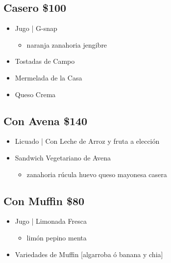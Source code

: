 \subsection{Casero \textbar{} \$100}\label{casero-100}
\begin{itemize} \tightlist
\item   Jugo | G-snap 
  \begin{itemize}
   \item naranja zanahoria jengibre
  \end{itemize}

\item   Tostadas de Campo
\item   Mermelada de la Casa
\item   Queso Crema
\end{itemize}

\bigskip

\subsection{Con Avena \textbar{} \$140}\label{con-avena-140}
\begin{itemize} \tightlist
\item  Licuado | Con Leche de Arroz y fruta a elección %
\item  Sandwich Vegetariano de Avena 
  \begin{itemize}
   \item zanahoria rúcula huevo queso mayonesa casera
  \end{itemize}

\end{itemize}


\bigskip \bigskip \bigskip \bigskip \bigskip

\subsection{Con Muffin \textbar{} \$80}\label{con-muffin-80}
\begin{itemize} \tightlist
\item   Jugo | Limonada Fresca 
  \begin{itemize}
   \item limón pepino menta
  \end{itemize}

\item   Variedades de Muffin [algarroba ó banana y chia]
\end{itemize}

\bigskip

